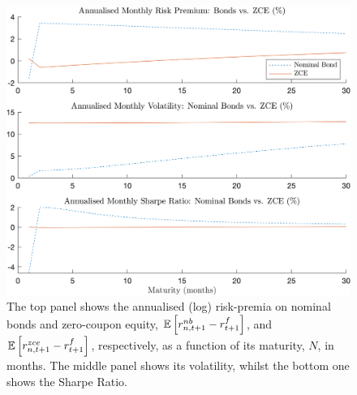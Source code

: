 \begin{figure}[h!]
	\centering
	\captionsetup{font=small, width=0.8\textwidth}
	\caption{The top panel shows the annualised (log)  risk-premia on nominal bonds and zero-coupon equity, $\mathbb{E}\left[r_{n,t+1}^{nb}-r^f_{t+1}\right]$, and $\mathbb{E}\left[r_{n,t+1}^{zce}-r^f_{t+1}\right]$, respectively, as a function of its maturity, $N$, in months. The middle panel shows its volatility, whilst the bottom one shows the Sharpe Ratio.}\vspace{0.25cm}
	\includegraphics[scale=0.7]{secs/fig/maturities_with_infl.png}
\end{figure}